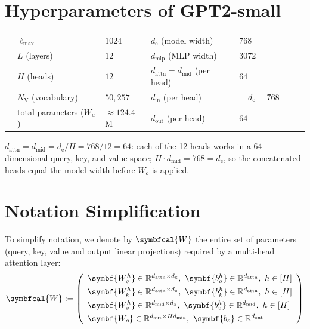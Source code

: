 \documentclass[12pt]{article}
\begin{document}
\section{Hyperparameters of GPT2-small}
\begin{center}
\begin{tabular}{r@{}llll@{}}
\toprule
\hspace*{2.5em}&$\ell_{\text{max}}$       & $1024$ \qquad\qquad & $d_{\text{e}}$ (model width)            & $768$\\
&$L$ (layers)       & $12$                & $d_\text{mlp}$ (MLP width)          & $3072$ \\
&$H$ (heads)        & $12$                & $d_\text{attn}=d_\text{mid}$ (per head)  & $64$ \\
&$N_{\text{V}}$ (vocabulary) & $50{,}257$          & $d_\text{in}$ (per head)            & $= d_{\text{e}} = 768  \hspace*{2.5em}$ \\
&total parameters ($W_u$)& $\approx124.4$M& $d_\text{out}$ (per head)           & $64$\\
\bottomrule
\end{tabular}
\end{center}
$d_\text{attn}=d_\text{mid}=d_{\text{e}}/H=768/12=64$: each of the 12 heads works in a 64-dimensional
query, key, and value space; $H\cdot d_\text{mid}=768=d_{\text{e}}$, so the concatenated heads equal the
model width before $W_o$ is applied.

\section{Notation Simplification}
To simplify notation, we denote by $\symbfcal{W}$ the entire set of parameters (query, key,
value and output linear projections) required by a multi-head attention layer:
\begin{equation}
\symbfcal{W} := \left(
\begin{array}{l}
    \symbf{W_q^h} \in \mathbb{R}^{d_\text{attn}\times d_\text{x}},\ \symbf{b_q^h} \in \mathbb{R}^{d_\text{attn}},\ h\in[H] \\[4pt]
    \symbf{W_k^h} \in \mathbb{R}^{d_\text{attn}\times d_z},\ \symbf{b_k^h} \in \mathbb{R}^{d_\text{attn}},\ h\in[H] \\[4pt]
    \symbf{W_v^h} \in \mathbb{R}^{d_\text{mid}\times d_z},\ \symbf{b_v^h} \in \mathbb{R}^{d_\text{mid}},\ h\in[H] \\[4pt]
    \symbf{W_o} \in \mathbb{R}^{d_\text{out}\times Hd_\text{mid}},\ \symbf{b_o} \in \mathbb{R}^{d_\text{out}}
\end{array}
\right)
\label{eq:mha-params}
\end{equation}
\end{document}
